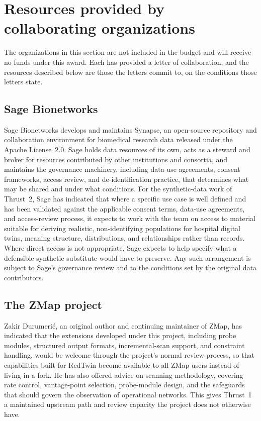 \documentclass[11pt,letterpaper]{article}
\newcommand{\sysname}{RedTwin\xspace}
\begin{document}
\section{Resources provided by collaborating organizations}

The organizations in this section are not included in the budget and will
receive no funds under this award. Each has provided a letter of
collaboration, and the resources described below are those the letters
commit to, on the conditions those letters state.

\subsection{Sage Bionetworks}
Sage Bionetworks develops and maintains Synapse, an open-source repository and
collaboration environment for biomedical research data released under the
Apache License~2.0. Sage holds data resources of its own, acts as a steward
and broker for resources contributed by other institutions and consortia, and
maintains the governance machinery, including data-use agreements, consent
frameworks, access review, and de-identification practice, that determines
what may be shared and under what conditions. For the synthetic-data work of
Thrust~2, Sage has indicated that where a specific use case is well defined
and has been validated against the applicable consent terms, data-use
agreements, and access-review process, it expects to work with the team on
access to material suitable for deriving realistic, non-identifying
populations for hospital digital twins, meaning structure, distributions, and
relationships rather than records. Where direct access is not appropriate,
Sage expects to help specify what a defensible synthetic substitute would have
to preserve. Any such arrangement is subject to Sage's governance review and
to the conditions set by the original data contributors.

\subsection{The ZMap project}
Zakir Durumeri\'c, an original author and continuing maintainer of ZMap, has
indicated that the extensions developed under this project, including probe
modules, structured output formats, incremental-scan support, and constraint
handling, would be welcome through the project's normal review process, so
that capabilities built for \sysname become available to all ZMap users
instead of living in a fork. He has also offered advice on scanning
methodology, covering rate control, vantage-point selection, probe-module
design, and the safeguards that should govern the observation of operational
networks. This gives Thrust~1 a maintained upstream path and review capacity
the project does not otherwise have.
\end{document}
